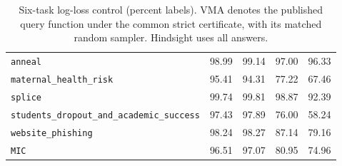 \begin{table}[t]
\centering\small{}\setlength{\tabcolsep}{3.5pt}
\caption{Six-task log-loss control (percent labels). VMA denotes the published query function under the common strict certificate, with its matched random sampler. Hindsight uses all answers.}
\label{tab:loglosscontrols}
\begin{tabularx}{\textwidth}{@{}XN{0.13\textwidth}N{0.15\textwidth}N{0.15\textwidth}N{0.15\textwidth}@{}}
\toprule
{} &  &  &  & \\\midrule
\nolinkurl{anneal} & 98.99 & 99.14 & 97.00 & 96.33\\
\nolinkurl{maternal_health_risk} & 95.41 & 94.31 & 77.22 & 67.46\\
\nolinkurl{splice} & 99.74 & 99.81 & 98.87 & 92.39\\
\nolinkurl{students_dropout_and_academic_success} & 97.43 & 97.89 & 76.00 & 58.24\\
\nolinkurl{website_phishing} & 98.24 & 98.27 & 87.14 & 79.16\\
\nolinkurl{MIC} & 96.51 & 97.07 & 80.95 & 74.96\\
\bottomrule
\end{tabularx}
\end{table}
